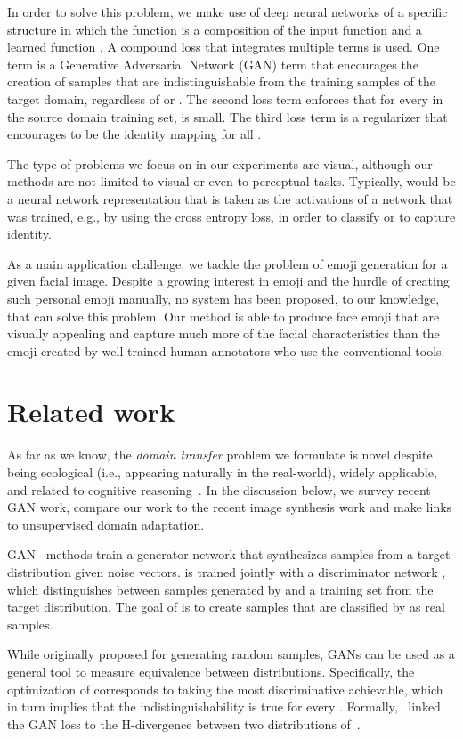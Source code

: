 \documentclass{article} \usepackage{iclr2017_conference,times}
\begin{document}
In order to solve this problem, we make use of deep neural networks of a specific structure in which the function  is a composition of the input function  and a learned function . A compound loss that integrates multiple terms is used. One term is a Generative Adversarial Network (GAN) term that encourages the creation of samples  that are indistinguishable from the training samples of the target domain, regardless of  or . The second loss term enforces that for every  in the source domain training set,  is small. The third loss term is a regularizer that encourages  to be the identity mapping for all .

The type of problems we focus on in our experiments are visual, although our methods are not limited to visual or even to perceptual tasks. Typically,  would be a neural network representation that is taken as the activations of a network that was trained, e.g., by using the cross entropy loss, in order to classify or to capture identity.

As a main application challenge, we tackle the problem of emoji generation for a given facial image. Despite a growing interest in emoji and the hurdle of creating such personal emoji manually, no system has been proposed, to our knowledge, that can solve this problem. Our method is able to produce face emoji that are visually appealing and capture much more of the facial characteristics than the emoji created by well-trained human annotators who use the conventional tools.

\section{Related work}
\label{sec:relatedwork}
As far as we know, the {\it domain transfer} problem we formulate is novel despite being ecological (i.e., appearing naturally in the real-world), widely applicable, and related to cognitive reasoning~\citep{thewaywethink}. In the discussion below, we survey recent GAN work, compare our work to the recent image synthesis work and make links to unsupervised domain adaptation.

GAN~\citep{gan} methods train a generator network  that synthesizes samples from a 
target distribution given noise vectors.  is trained jointly with a discriminator network , which distinguishes between samples generated by  and a training set from the target distribution. The goal of  is to create samples that are classified by  as real samples.

While originally proposed for generating random samples, GANs can be used as a general tool to measure equivalence between distributions. Specifically, the optimization of  corresponds to taking the most discriminative  achievable, which in turn implies that the indistinguishability is true for every . Formally,~\citet{domaingan} linked the GAN loss to the H-divergence between two distributions of~\citet{bendavid}.
\end{document}
